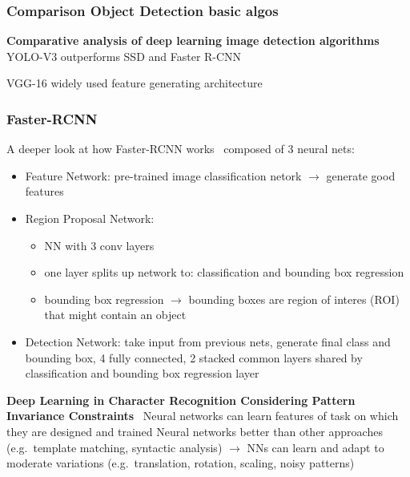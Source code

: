 \subsubsection*{Comparison Object Detection basic algos}
\textbf{Comparative analysis of deep learning image detection
algorithms}~\cite{srivastava_comparative_2021}
YOLO-V3 outperforms SSD and Faster R-CNN

VGG-16 widely used feature generating architecture

\subsubsection*{Faster-RCNN}
A deeper look at how Faster-RCNN works~\cite{goswami_deeper_2018}
composed of 3 neural nets:
\begin{itemize}
    \item Feature Network: pre-trained image classification netork $\rightarrow$ generate good features
    \item Region Proposal Network:
        \begin{itemize}
            \item NN with 3 conv layers
            \item one layer splits up network to: classification and bounding box regression
            \item bounding box regression $\rightarrow$ bounding boxes are region of interes (ROI)
                that might contain an object
        \end{itemize}
    \item Detection Network: take input from previous nets, generate final class and bounding box,
        4 fully connected, 2 stacked common layers shared by classification and bounding box regression
        layer \end{itemize}

\textbf{Deep Learning in Character Recognition Considering Pattern Invariance
Constraints}~\cite{oyedotun_deep_2015}
Neural networks can learn features of task on which they are designed and trained
Neural networks better than other approaches (e.g.\ template matching, syntactic analysis)
$\rightarrow$ NNs can learn and adapt to moderate variations (e.g.\ translation, rotation, scaling,
noisy patterns)

